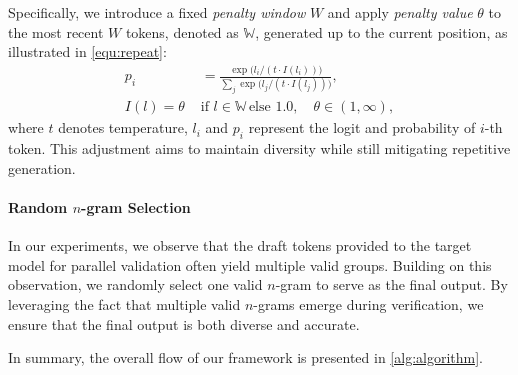 Specifically, we introduce a fixed \emph{penalty window} $W$ and apply \emph{penalty value} $\theta$ to the most recent $W$ tokens, denoted as $\mathbb{W}$, generated up to the current position, as illustrated in \cref{equ:repeat}: 
\begin{equation}
    \label{equ:repeat}
    \begin{aligned}
        p_i &= \frac{\exp \big(l_i/(t\cdot I(l_i))\big)}{\sum_j \exp \big(l_j/(t\cdot I(l_j))\big)},\\
    I(l)=\theta\,\,&\text{if}\,\,l \in \mathbb{W}\,\text{else}\,\,1.0,\quad \theta \in (1, \infty),
    \end{aligned}
\end{equation}
where $t$ denotes temperature, $l_i$ and $p_i$ represent the logit and probability of $i$-th token. This adjustment aims to maintain diversity while still mitigating repetitive generation.

\vspace{-0.05 in}
\paragraph{Random $n$-gram Selection}

In our experiments, we observe that the draft tokens provided to the target model for parallel validation often yield multiple valid groups. Building on this observation, we randomly select one valid $n$-gram to serve as the final output. By leveraging the fact that multiple valid $n$-grams emerge during verification, we ensure that the final output is both diverse and accurate.


In summary, the overall flow of our framework is presented in \cref{alg:algorithm}. 
